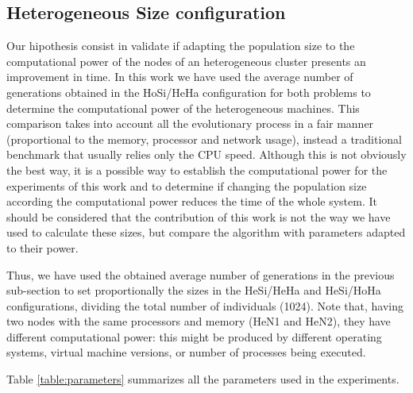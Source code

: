 \documentclass[final,1p,times]{elsarticle}
\begin{document}
\subsection{Heterogeneous Size configuration}

Our hipothesis consist in validate if adapting the population size to the computational power of the nodes of an heterogeneous cluster presents an improvement in time. In this work we have used the average number of generations obtained in the HoSi/HeHa configuration for both problems to determine the computational power of the heterogeneous machines. This comparison takes into account all the evolutionary process in a fair manner (proportional to the memory, processor and network usage), instead a traditional benchmark that usually relies only the CPU speed. Although this is not obviously the best way, it is a possible way to establish the computational power for the experiments of this work and to determine if changing the population size according the computational power reduces the time of the whole system. It should be considered that the contribution of this work is not the way we have used to calculate these sizes, but compare the algorithm with parameters adapted to their power.

Thus, we have used the obtained average number of generations in the previous sub-section to set proportionally the sizes in the HeSi/HeHa and HeSi/HoHa configurations, dividing the total number of individuals (1024). Note that, having two nodes with the same processors and memory (HeN1 and HeN2), they have different computational power: this might be produced by different operating systems, virtual machine versions, or number of processes being executed.

Table \ref{table:parameters} summarizes all the parameters used in the experiments.
\end{document}
